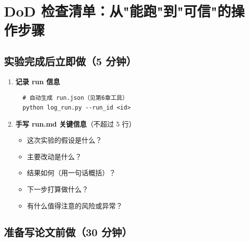 \section{DoD 检查清单：从"能跑"到"可信"的操作步骤}

\subsection{实验完成后立即做（5 分钟）}

\begin{enumerate}
  \item \textbf{记录 run 信息}
  \begin{verbatim}
  # 自动生成 run.json（见第6章工具）
  python log_run.py --run_id <id>
  \end{verbatim}

  \item \textbf{手写 run.md 关键信息}（不超过 5 行）
  \begin{itemize}
    \item 这次实验的假设是什么？
    \item 主要改动是什么？
    \item 结果如何（用一句话概括）？
    \item 下一步打算做什么？
    \item 有什么值得注意的风险或异常？
  \end{itemize}
\end{enumerate}

\subsection{准备写论文前做（30 分钟）}

